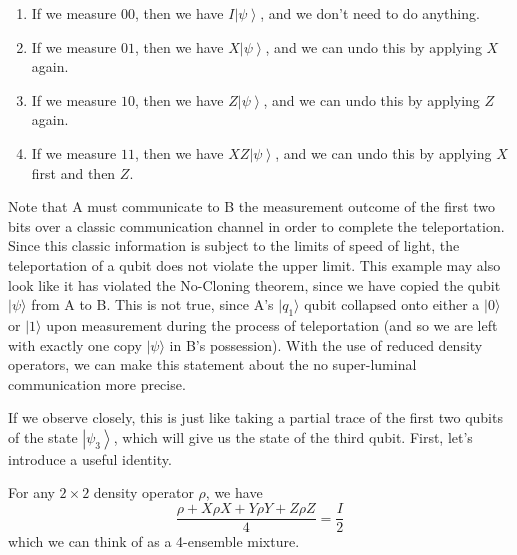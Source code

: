\documentclass{article}
\newcommand{\ket}[1]{\ensuremath{\left|#1\right\rangle}}
\begin{document}
\begin{theorem}
\begin{enumerate}
          \begin{enumerate} 
            \item If we measure $00$, then we have $I \ket{\psi}$, and we don't need to do anything. 
            \item If we measure $01$, then we have $X \ket{\psi}$, and we can undo this by applying $X$ again. 
            \item If we measure $10$, then we have $Z \ket{\psi}$, and we can undo this by applying $Z$ again.
            \item If we measure $11$, then we have $X Z \ket{\psi}$, and we can undo this by applying $X$ first and then $Z$. 
          \end{enumerate}
      \end{enumerate}
    \end{theorem}

    Note that A must communicate to B the measurement outcome of the first two bits over a classic communication channel in order to complete the teleportation. Since this classic information is subject to the limits of speed of light, the teleportation of a qubit does not violate the upper limit. This example may also look like it has violated the No-Cloning theorem, since we have copied the qubit $|\psi\rangle$ from A to B. This is not true, since A's $|q_1\rangle$ qubit collapsed onto either a $|0\rangle$ or $|1\rangle$ upon measurement during the process of teleportation (and so we are left with exactly one copy $|\psi\rangle$ in B's possession). With the use of reduced density operators, we can make this statement about the no super-luminal communication more precise. 

    If we observe closely, this is just like taking a partial trace of the first two qubits of the state $\ket{\psi_3}$, which will give us the state of the third qubit. First, let's introduce a useful identity. 

    \begin{lemma}
      For any $2 \times 2$ density operator $\rho$, we have 
      \begin{equation}
        \frac{\rho + X \rho X + Y \rho Y + Z \rho Z}{4} = \frac{I}{2}
      \end{equation}
      which we can think of as a 4-ensemble mixture. 
    \end{lemma}
\end{document}
